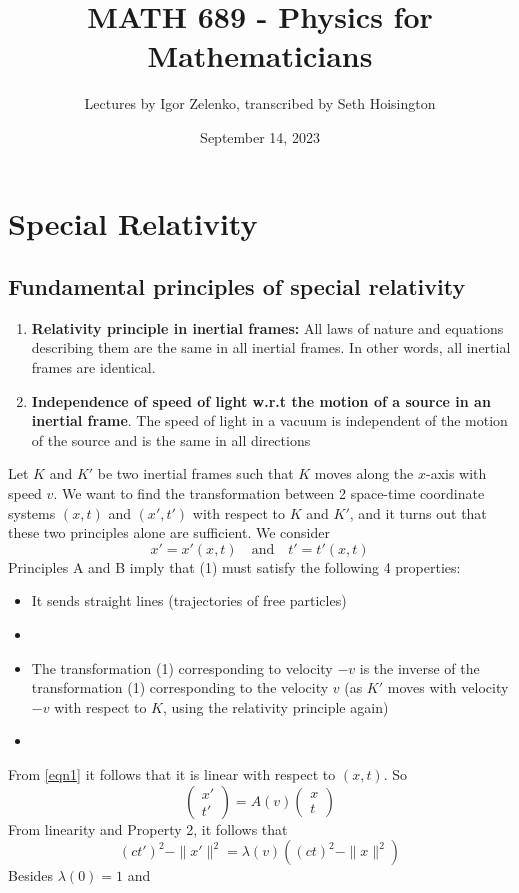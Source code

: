 \documentclass{article}
\title{MATH 689 - Physics for Mathematicians}
\author{Lectures by Igor Zelenko, transcribed by Seth Hoisington}
\date{September 14, 2023}
\begin{document}
\maketitle
\section*{Special Relativity}
\subsection*{Fundamental principles of special relativity}
\begin{enumerate}[label=\Alph*]
    \item \textbf{Relativity principle in inertial frames:} All laws of nature and equations describing them are the same in all inertial frames. In other words, all inertial frames are identical.
    \item \textbf{Independence of speed of light w.r.t the motion of a source in an inertial frame}. The speed of light in a vacuum is independent of the motion of the source and is the same in all directions
\end{enumerate}
Let $K$ and $K'$ be two inertial frames such that $K$ moves along the $x$-axis with speed $v$. We want to find the transformation between 2 space-time coordinate systems $(x,t)$ and $(x',t')$ with respect to $K$ and $K'$, and it turns out that these two principles alone are sufficient. We consider
\begin{equation}
    x' = x'(x,t)\quad\text{and}\quad t' = t'(x,t)
\end{equation}
Principles A and B imply that (1) must satisfy the following 4 properties:
\begin{itemize}
    \item It sends straight lines (trajectories of free particles) 
    \item 
    \item The transformation (1) corresponding to velocity $-v$ is the inverse of the transformation (1) corresponding to the velocity $v$ (as $K'$ moves with velocity $-v$ with respect to $K$, using the relativity principle again)
    \item 
\end{itemize}
From \ref{eqn1} it follows that it is linear with respect to $(x,t)$. So
\[\begin{pmatrix}
    x'\\
    t'
\end{pmatrix}=A(v)\begin{pmatrix}
    x\\
    t
\end{pmatrix}\]
From linearity and Property 2, it follows that 
\begin{equation}
    (ct')^2-\|x'\|^2 = \lambda(v)((ct)^2 - \|x\|^2)
\end{equation}
Besides $\lambda(0) = 1$ and 
\end{document}
